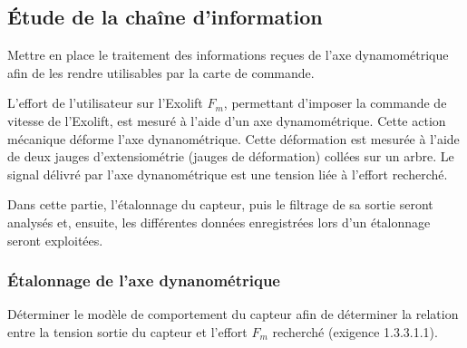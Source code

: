 %
%
%
%
%
%
%
%
%
%
%
\subsection{Étude de la chaîne d'information}\label{II}


\begin{objectif}
Mettre en place le traitement des informations reçues de l'axe dynamométrique afin de les rendre utilisables par la carte de commande.
\end{objectif}

L'effort de l'utilisateur sur l'Exolift $F_{m}$, permettant d'imposer la commande de vitesse de l'Exolift, est mesuré à l'aide d'un axe dynamométrique. Cette action mécanique déforme l'axe dynanométrique. Cette déformation est mesurée à l'aide de deux jauges d'extensiométrie (jauges de déformation) collées sur un arbre. Le signal délivré par l'axe dynanométrique est une tension liée à l'effort recherché.

Dans cette partie, l'étalonnage du capteur, puis le filtrage de sa sortie seront analysés et, ensuite, les différentes données enregistrées lors d'un étalonnage seront exploitées.
%
\subsubsection{Étalonnage de l'axe dynanométrique}\label{II.1}

\begin{objectif}
Déterminer le modèle de comportement du capteur afin de déterminer la relation entre la tension sortie du capteur et l'effort $F_{m}$ recherché (exigence 1.3.3.1.1).
\end{objectif}



